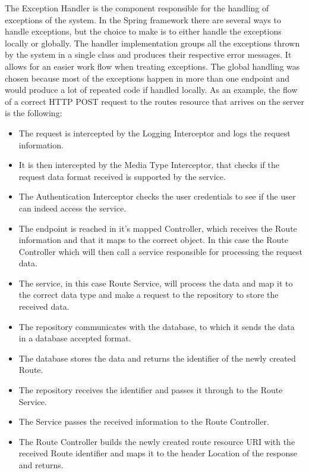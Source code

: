 The Exception Handler is the component responsible for the handling of exceptions of the system. In the Spring framework there 
are several ways to handle exceptions, but the choice to make is to either handle the exceptions locally or globally. The 
handler implementation groups all the exceptions thrown by the system in a single class and produces their respective error 
messages. It allows for an easier work flow when treating exceptions. The global handling was chosen because most of the 
exceptions happen in more than one endpoint and would produce a lot of repeated code if handled locally.      
\newpage
As an example, the flow of a correct HTTP POST request to the routes resource that arrives on the server is the following:
    \begin{itemize}
        \item The request is intercepted by the Logging Interceptor and logs the request information.
        \item It is then intercepted by the Media Type Interceptor, that checks if the request data format 
        received is supported by the service.
        \item The Authentication Interceptor checks the user credentials to see if the user can indeed access the service.
        \item The endpoint is reached in it's mapped Controller, which receives the Route information and that it 
        maps to the correct object. In this case the Route Controller which will then call a service responsible 
        for processing the request data.
        \item The service, in this case Route Service, will process the data and map it  to the correct data type 
        and make a request to the repository to store the received data.
        \item The repository communicates with the database, to which it sends the data in a database accepted format.
        \item The database stores the data and returns the identifier of the newly created Route.
        \item The repository receives the identifier and passes it through to the Route Service.
        \item The Service passes the received information to the Route Controller.
        \item The Route Controller builds the newly created route resource URI with the received Route identifier 
        and maps it to the header Location of the response and returns.
    \end{itemize}
    \newpage
